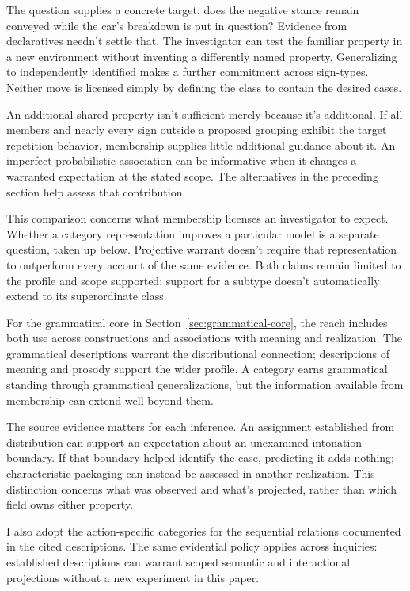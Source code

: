 \documentclass[12pt]{article}
\begin{document}
The question supplies a concrete target: does the negative stance
remain conveyed while the car's breakdown is put in question? Evidence
from declaratives needn't settle that. The investigator can test the
familiar property in a new environment without inventing a differently
named property. Generalizing to independently identified 
makes a further commitment across sign-types. Neither move is licensed
simply by defining the class to contain the desired cases.

An additional shared property isn't sufficient merely because it's
additional. If all members and nearly every sign outside a proposed
grouping exhibit the target repetition behavior, membership supplies
little additional guidance about it. An imperfect probabilistic association can be
informative when it changes a warranted expectation at the stated
scope. The alternatives in the preceding section help assess that
contribution.

This comparison concerns what membership licenses an investigator to
expect. Whether a category representation improves a particular model
is a separate question, taken up below. Projective warrant doesn't
require that representation to outperform every account of the same
evidence. Both claims remain limited to the profile and scope supported:
support for a subtype doesn't automatically extend to its superordinate
class.

For the grammatical core in Section~\ref{sec:grammatical-core}, the reach
includes both use across constructions and associations with meaning
and realization. The grammatical descriptions warrant the distributional
connection; descriptions of meaning and prosody support the wider profile.
A category earns grammatical standing through grammatical generalizations,
but the information available from membership can extend well beyond them.

The source evidence matters for each inference. An assignment established
from distribution can support an expectation about an unexamined intonation
boundary. If that boundary helped identify the case, predicting it
adds nothing; characteristic packaging can instead be assessed in another
realization. This distinction concerns what was observed and what's
projected, rather than which field owns either property.

I also adopt the action-specific categories for the sequential relations
documented in the cited descriptions. The same evidential policy applies
across inquiries: established descriptions can warrant scoped semantic and
interactional projections without a new experiment in this paper.
\end{document}

